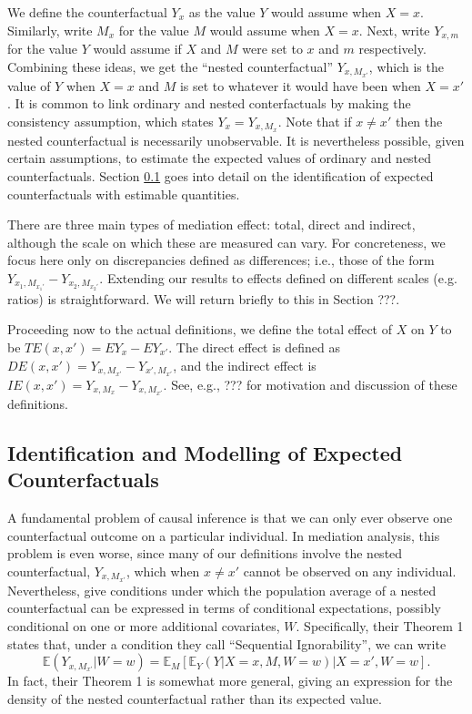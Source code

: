 \documentclass{article}
\newcommand{\bE}{\mathbb{E}}
\begin{document}
We define the counterfactual $Y_x$ as the value $Y$ would assume when $X=x$. Similarly, write $M_x$ for the value $M$ would assume when $X=x$. Next, write $Y_{x,m}$ for the value $Y$ would assume if $X$ and $M$ were set to $x$ and $m$ respectively. Combining these ideas, we get the ``nested counterfactual'' $Y_{x, M_{x'}}$, which is the value of $Y$ when $X=x$ and $M$ is set to whatever it would have been when $X=x'$. It is common to link ordinary and nested conterfactuals by making the consistency assumption, which states $Y_x = Y_{x, M_x}$. Note that if $x \neq x'$ then the nested counterfactual is necessarily unobservable. It is nevertheless possible, given certain assumptions, to estimate the expected values of ordinary and nested counterfactuals. Section \ref{sec:ID} goes into detail on the identification of expected counterfactuals with estimable quantities.

There are three main types of mediation effect: total, direct and indirect, although the scale on which these are measured can vary. For concreteness, we focus here only on discrepancies defined as differences; i.e., those of the form $Y_{x_1, M_{x_1'}} - Y_{x_2, M_{x_2'}}$. Extending our results to effects defined on different scales (e.g. ratios) is straightforward. We will return briefly to this in Section ???.

Proceeding now to the actual definitions, we define the total effect of $X$ on $Y$ to be $TE(x, x') = EY_x - EY_{x'}$. The direct effect is defined as $DE(x, x') = Y_{x, M_{x'}} - Y_{x', M_{x'}}$, and the indirect effect is $IE(x, x') = Y_{x, M_{x}} - Y_{x, M_{x'}}$. See, e.g., ??? for motivation and discussion of these definitions.





\subsection{Identification and Modelling of Expected Counterfactuals}
\label{sec:ID}

A fundamental problem of causal inference is that we can only ever observe one counterfactual outcome on a particular individual. In mediation analysis, this problem is even worse, since many of our definitions involve the nested counterfactual, $Y_{x, M_{x'}}$, which when $x \neq x'$ cannot be observed on any individual. Nevertheless, \citet{Ima10I} give conditions under which the population average of a nested counterfactual can be expressed in terms of conditional expectations, possibly conditional on one or more additional covariates, $W$. Specifically, their Theorem 1 states that, under a condition they call ``Sequential Ignorability'', we can write
%
\begin{equation}
    \bE (Y_{x, M_{x'}} | W=w) = \bE_M \left[ \bE_Y \left( Y | X=x, M, W=w \right) | X=x', W=w \right]. \label{eq:ID}
\end{equation}
%
In fact, their Theorem 1 is somewhat more general, giving an expression for the density of the nested counterfactual rather than its expected value.
\end{document}

